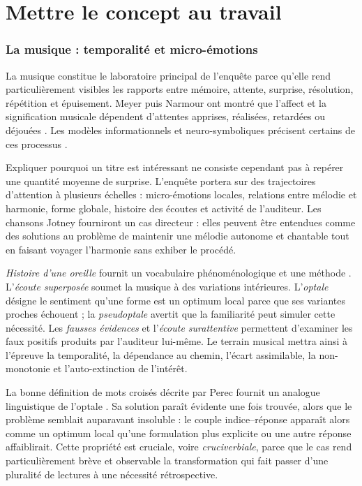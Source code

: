 \documentclass[11pt,a4paper]{article}
\begin{document}
\part{Mettre le concept au travail}

\section{La musique : temporalité et micro-émotions}

La musique constitue le laboratoire principal de l'enquête parce qu'elle rend
particulièrement visibles les rapports entre mémoire, attente, surprise,
résolution, répétition et épuisement. Meyer puis Narmour ont montré que l'affect
et la signification musicale dépendent d'attentes apprises, réalisées, retardées
ou déjouées
\parencite{meyer1956emotion,narmour1990basic,narmour1992complexity}. Les modèles
informationnels et neuro-symboliques précisent certains de ces processus
\parencite{abdallah2009information,berger1999expectations,gang1999unified}.

Expliquer pourquoi un titre est intéressant ne consiste cependant pas à repérer
une quantité moyenne de surprise. L'enquête portera sur des trajectoires
d'attention à plusieurs échelles : micro-émotions locales, relations entre
mélodie et harmonie, forme globale, histoire des écoutes et activité de
l'auditeur. Les chansons Jotney fourniront un cas directeur : elles peuvent être
entendues comme des solutions au problème de maintenir une mélodie autonome et
chantable tout en faisant voyager l'harmonie sans exhiber le procédé.

\emph{Histoire d'une oreille} fournit un vocabulaire phénoménologique et une
méthode \parencite{pachet2018oreille}. L'\emph{écoute superposée} soumet la
musique à des variations intérieures. L'\emph{optale} désigne le sentiment
qu'une forme est un optimum local parce que ses variantes proches échouent ; la
\emph{pseudoptale} avertit que la familiarité peut simuler cette nécessité. Les
\emph{fausses évidences} et l'\emph{écoute surattentive} permettent d'examiner
les faux positifs produits par l'auditeur lui-même. Le terrain musical mettra
ainsi à l'épreuve la temporalité, la dépendance au chemin, l'écart assimilable,
la non-monotonie et l'auto-extinction de l'intérêt.

La bonne définition de mots croisés décrite par Perec fournit un analogue
linguistique de l'optale \parencite{perec1999motscroises}. Sa solution paraît
évidente une fois trouvée, alors que le problème semblait auparavant insoluble : le
couple indice--réponse apparaît alors comme un optimum local qu'une formulation
plus explicite ou une autre réponse affaiblirait. Cette propriété est cruciale,
voire \emph{cruciverbiale}, parce que le cas rend particulièrement brève et
observable la transformation qui fait passer d'une pluralité de lectures à une
nécessité rétrospective.
\end{document}
